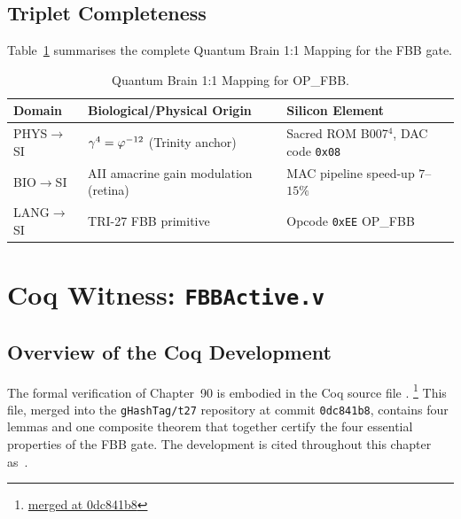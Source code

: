\subsection{Triplet Completeness}
\label{subsec:triplet-complete}

Table~\ref{tab:triplet} summarises the complete Quantum Brain 1:1 Mapping
for the FBB gate.

\begin{table}[htbp]
  \centering
  \caption{Quantum Brain 1:1 Mapping for OP\_FBB.}
  \label{tab:triplet}
  \begin{tabular}{@{}lll@{}}
    \toprule
    Domain & Biological/Physical Origin & Silicon Element \\
    \midrule
    PHYS$\to$SI
      & $\gamma^{4}{} = \varphi^{-12}{}$ (Trinity anchor)
      & Sacred ROM B007$^{4}$, DAC code \texttt{0x08} \\
    BIO$\to$SI
      & AII amacrine gain modulation (retina)
      & MAC pipeline speed-up $7$--$15\%$ \\
    LANG$\to$SI
      & TRI-27 FBB primitive
      & Opcode \texttt{0xEE} OP\_FBB \\
    \bottomrule
  \end{tabular}
\end{table}

\medskip
\noindent\anchorline{}

\section{Coq Witness: \texttt{FBBActive.v}}
\label{sec:coq-witness}

\subsection{Overview of the Coq Development}
\label{subsec:coq-overview}

The formal verification of Chapter~90 is embodied in the Coq source file
\coqfile{}.%
\footnote{\href{https://github.com/gHashTag/t27/blob/master/trios-coq/Physics/FBBActive.v}%
  {merged at 0dc841b8}}
This file, merged into the \texttt{gHashTag/t27} repository at commit
\texttt{0dc841b8}, contains four lemmas and one composite theorem that
together certify the four essential properties of the FBB gate.  The
development is cited throughout this chapter as~\cite{CoqFBBActive2026}.

